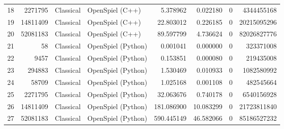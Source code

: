 \begin{tabular}{lrllrrrr}
18 & 2271795 & Classical & OpenSpiel (C++) & 5.378962 & 0.022180 & 0 & 4344455168 \\
19 & 14811409 & Classical & OpenSpiel (C++) & 22.803012 & 0.226185 & 0 & 20215095296 \\
20 & 52081183 & Classical & OpenSpiel (C++) & 89.597799 & 4.736624 & 0 & 82026827776 \\
21 & 58 & Classical & OpenSpiel (Python) & 0.001041 & 0.000000 & 0 & 323371008 \\
22 & 9457 & Classical & OpenSpiel (Python) & 0.153851 & 0.000080 & 0 & 219435008 \\
23 & 294883 & Classical & OpenSpiel (Python) & 1.530469 & 0.010933 & 0 & 1082580992 \\
24 & 58709 & Classical & OpenSpiel (Python) & 1.025168 & 0.001108 & 0 & 482545664 \\
25 & 2271795 & Classical & OpenSpiel (Python) & 32.063676 & 0.740178 & 0 & 6540156928 \\
26 & 14811409 & Classical & OpenSpiel (Python) & 181.086900 & 10.083299 & 0 & 21723811840 \\
27 & 52081183 & Classical & OpenSpiel (Python) & 590.445149 & 46.582066 & 0 & 85186527232 \\
\bottomrule
\end{tabular}

